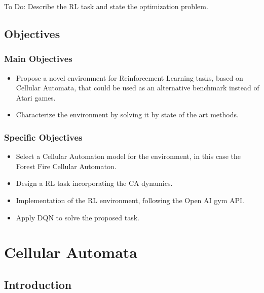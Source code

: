 \documentclass[
  openany]{book}
\providecommand{\tightlist}{%
  \setlength{\itemsep}{0pt}\setlength{\parskip}{0pt}}
\begin{document}
To Do: Describe the RL task and state the optimization problem.

\hypertarget{objectives}{%
\section{Objectives}\label{objectives}}

\hypertarget{main-objectives}{%
\subsection{Main Objectives}\label{main-objectives}}

\begin{itemize}
\tightlist
\item
  Propose a novel environment for Reinforcement Learning tasks, based on Cellular Automata, that could be used as an alternative benchmark instead of Atari games.
\item
  Characterize the environment by solving it by state of the art methods.
\end{itemize}

\hypertarget{specific-objectives}{%
\subsection{Specific Objectives}\label{specific-objectives}}

\begin{itemize}
\tightlist
\item
  Select a Cellular Automaton model for the environment, in this case the Forest Fire Cellular Automaton.
\item
  Design a RL task incorporating the CA dynamics.
\item
  Implementation of the RL environment, following the Open AI gym API.
\item
  Apply DQN to solve the proposed task.
\end{itemize}

\hypertarget{cellular-automata}{%
\chapter{Cellular Automata}\label{cellular-automata}}

\hypertarget{introduction-1}{%
\section{Introduction}\label{introduction-1}}
\end{document}
